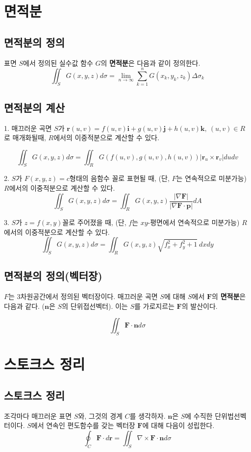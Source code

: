 \documentclass[chapter, oneside]{oblivoir}
\newcommand{\term}[1]{\textbf{#1}}
\begin{document}
\section{면적분}
\subsection{면적분의 정의}
표면 $S$에서 정의된 실수값 함수 $G$의 \term{면적분}은 다음과 같이 정의한다.
$$ \iint_S G(x,y,z) d\sigma = \lim_{n \to \infty}\sum_{k=1}^{n} G(x_k , y_k , z_k ) \Delta \sigma_k $$
\subsection{면적분의 계산}
1. 매끄러운 곡면 $S$가 $\textbf{r}(u,v) = f(u,v)\textbf{i}+g(u,v)\textbf{j}+h(u,v)\textbf{k},\ (u,v) \in R$로 매개화될때, $R$에서의 이중적분으로 계산할 수 있다.

$$ \iint_S G(x,y,z) d\sigma = \iint_R G(f(u,v), g(u,v), h(u,v))\left| \textbf{r}_u \times \textbf{r}_v \right| du dv $$

2. $S$가 $F(x,y,z)=c$형태의 음함수 꼴로 표현될 때, (단, $F$는 연속적으로 미분가능) $R$에서의 이중적분으로 계산할 수 있다.
$$ \iint_S G(x,y,z) d\sigma = \iint_R G(x,y,z) \frac{\left| \nabla \textbf{F} \right|}{\left| \nabla \textbf{F} \cdot \textbf{p} \right|} dA $$

3. $S$가 $z=f(x,y)$꼴로 주어졌을 때, (단, $f$는 $xy$-평면에서 연속적으로 미분가능)  $R$에서의 이중적분으로 계산할 수 있다.
$$ \iint_S G(x,y,z) d\sigma = \iint_R G(x,y,z) \sqrt{f_x^2 + f_y^2 + 1} \ dx dy $$

\subsection{면적분의 정의(벡터장)}
$F$는 3차원공간에서 정의된 벡터장이다. 매끄러운 곡면 $S$에 대해 $S$에서 $\textbf{F}$의 \term{면적분}은 다음과 같다. ($\textbf{n}$은 $S$의 단위접선벡터). 이는 $S$를 가로지르는 $\textbf{F}$의 발산이다.

$$ \iint_S \textbf{F} \cdot \textbf{n} d\sigma$$


\section{스토크스 정리}
\subsection{스토크스 정리}
조각마다 매끄러운 표면 $S$와, 그것의 경계 $C$를 생각하자. $\textbf{n}$은 $S$에 수직한 단위법선벡터이다. $S$에서 연속인 편도함수를 갖는 벡터장 $\textbf{F}$에 대해 다음이 성립한다.
$$\oint_C \textbf{F} \cdot d\textbf{r} = \iint_S \nabla \times \textbf{F} \cdot \textbf{n} d\sigma $$
\end{document}
